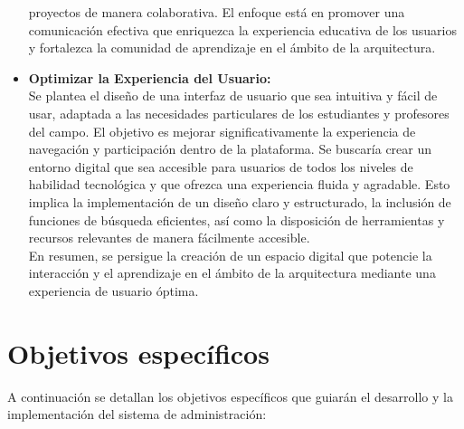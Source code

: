 \documentclass[a4paper, 12pt]{book}
\begin{document}
\begin{itemize}
  proyectos de manera colaborativa. El enfoque está en promover una comunicación efectiva que enriquezca la experiencia educativa de los usuarios y fortalezca la 
  comunidad de aprendizaje en el ámbito de la arquitectura.
  \item \textbf{Optimizar la Experiencia del Usuario: } \\ Se plantea el diseño de una interfaz de usuario que sea intuitiva y fácil de usar, adaptada a las 
  necesidades particulares de los estudiantes y profesores del campo. El objetivo es mejorar significativamente la experiencia de navegación y participación 
  dentro de la plataforma. Se buscaría crear un entorno digital que sea accesible para usuarios de todos los niveles de habilidad tecnológica y que ofrezca 
  una experiencia fluida y agradable. Esto implica la implementación de un diseño claro y estructurado, la inclusión de funciones de búsqueda eficientes, 
  así como la disposición de herramientas y recursos relevantes de manera fácilmente accesible. \\ En resumen, se persigue la creación de un espacio digital 
  que potencie la interacción y el aprendizaje en el ámbito de la arquitectura mediante una experiencia de usuario óptima.
\end{itemize}

\section{Objetivos específicos}
\label{sec:objetivos-especificos}

A continuación se detallan los objetivos específicos que guiarán el desarrollo y la implementación del sistema de administración:
\end{document}
